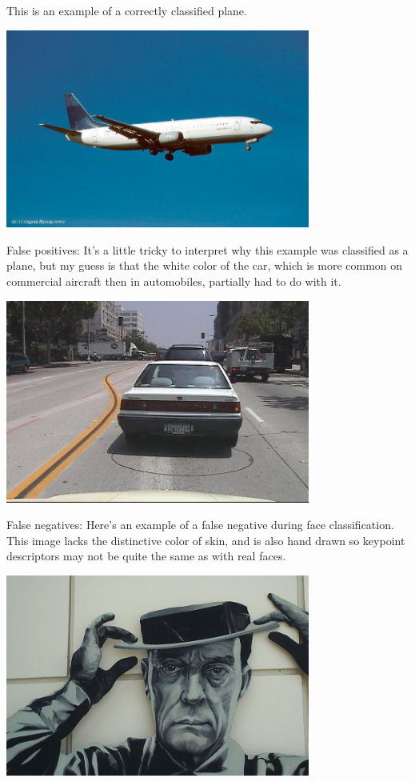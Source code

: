 \documentclass[11pt]{article}
\begin{document}
This is an example of a correctly classified plane.

\includegraphics[width=100mm]{images/plane_true_positive.png}

False positives:
It's a little tricky to interpret why this example was classified as a
plane, but my guess is that the white color of the car, which is more
common on commercial aircraft then in automobiles, partially had to do
with it.

\includegraphics[width=100mm]{images/plane_false_positive.png}

False negatives:
Here's an example of a false negative during face classification. This
image lacks the distinctive color of skin, and is also hand drawn so
keypoint descriptors may not be quite the same as with real faces.

\includegraphics[width=100mm]{images/face_false_negative.png}
\end{document}
